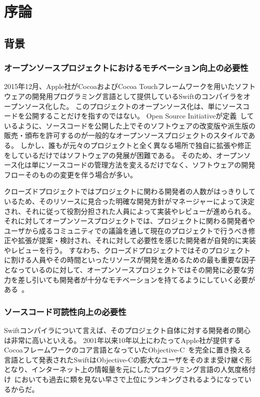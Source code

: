 \chapter{序論}
\label{introduction}

\section{背景}
\label{introduction:background}

\subsection{オープンソースプロジェクトにおけるモチベーション向上の必要性}

2015年12月、Apple社がCocoaおよびCocoa Touchフレームワークを用いたソフトウェアの開発用プログラミング言語として提供しているSwiftのコンパイラをオープンソース化した。
このプロジェクトのオープンソース化は、単にソースコードを公開することだけを指すのではない。
Open Source Initiativeが定義~\cite{opensource}しているように、ソースコードを公開した上でそのソフトウェアの改変版や派生版の販売・頒布を許可するのが一般的なオープンソースプロジェクトのスタイルである。
しかし、誰もが元々のプロジェクトと全く異なる場所で独自に拡張や修正をしているだけではソフトウェアの発展が困難である。
そのため、オープンソース化は単にソースコードの管理方法を変えるだけでなく、ソフトウェアの開発フローそのものの変更を伴う場合が多い。

クローズドプロジェクトではプロジェクトに関わる開発者の人数がはっきりしているため、そのリソースに見合った明確な開発方針がマネージャーによって決定され、それに従って役割分担された人員によって実装やレビューが進められる。
それに対してオープンソースプロジェクトでは、プロジェクトに関わる開発者やユーザから成るコミュニティでの議論を通して現在のプロジェクトで行うべき修正や拡張が提案・検討され、それに対して必要性を感じた開発者が自発的に実装やレビューを行う。
すなわち、クローズドプロジェクトではそのプロジェクトに割ける人員やその時間といったリソースが開発を進めるための最も重要な因子となっているのに対して、オープンソースプロジェクトではその開発に必要な労力を差し引いても開発者が十分なモチベーションを持てるようにしていく必要がある~\cite{raymond}。

\subsection{ソースコード可読性向上の必要性}

Swiftコンパイラについて言えば、そのプロジェクト自体に対する開発者の関心は非常に高いといえる。
2001年以来10年以上にわたってApple社が提供するCocoaフレームワークのコア言語となっていたObjective-C~\cite{objective-c}を完全に置き換える言語として発表されたSwiftはObjective-Cの膨大なユーザをそのまま受け継ぐ形となり、インターネット上の情報量を元にしたプログラミング言語の人気度格付け~\cite{tiobe, redmonk}においても過去に類を見ない早さで上位にランキングされるようになっているからだ。

